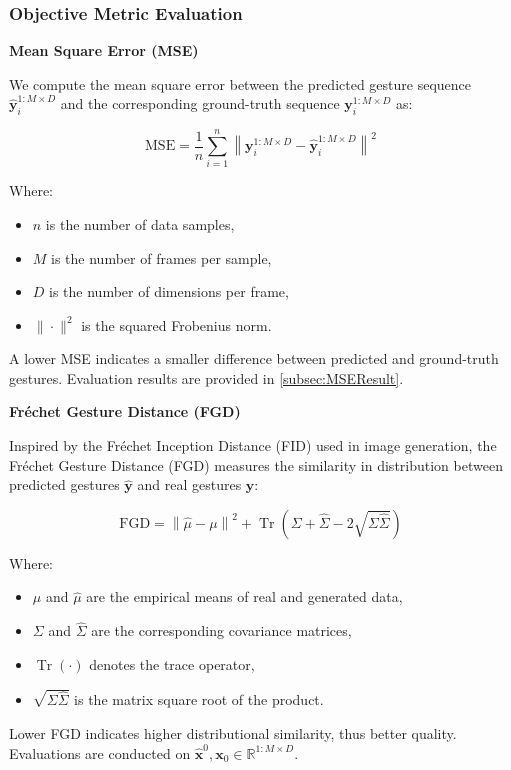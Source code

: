 
\subsubsection{Objective Metric Evaluation}

\textbf{Mean Square Error (MSE)}

We compute the mean square error between the predicted gesture sequence $\hat{\mathbf{y}}_i^{1:M \times D}$ and the corresponding ground-truth sequence $\mathbf{y}_i^{1:M \times D}$ as:

\begin{equation}
	\text{MSE} = \frac{1}{n} \sum_{i=1}^n \left\| \mathbf{y}_i^{1:M \times D} - \hat{\mathbf{y}}_i^{1:M \times D} \right\|^2
\end{equation}

Where:
\begin{itemize}
	\item $n$ is the number of data samples,
	\item $M$ is the number of frames per sample,
	\item $D$ is the number of dimensions per frame,
	\item $\|\cdot\|^2$ is the squared Frobenius norm.
\end{itemize}

A lower MSE indicates a smaller difference between predicted and ground-truth gestures. Evaluation results are provided in \autoref{subsec:MSEResult}.

\textbf{Fréchet Gesture Distance (FGD)}

Inspired by the Fréchet Inception Distance (FID) used in image generation, the Fréchet Gesture Distance (FGD) measures the similarity in distribution between predicted gestures $\hat{\mathbf{y}}$ and real gestures $\mathbf{y}$:

\begin{equation}
	\text{FGD} = \left\| \hat{\mu} - \mu \right\|^2 + \operatorname{Tr}\left( \Sigma + \hat{\Sigma} - 2 \sqrt{\Sigma \hat{\Sigma}} \right)
	\label{eq:fidscore}
\end{equation}

Where:
\begin{itemize}
	\item $\mu$ and $\hat{\mu}$ are the empirical means of real and generated data,
	\item $\Sigma$ and $\hat{\Sigma}$ are the corresponding covariance matrices,
	\item $\operatorname{Tr}(\cdot)$ denotes the trace operator,
	\item $\sqrt{\Sigma \hat{\Sigma}}$ is the matrix square root of the product.
\end{itemize}

Lower FGD indicates higher distributional similarity, thus better quality. Evaluations are conducted on $\hat{\mathbf{x}}^{0}, \mathbf{x}_0 \in \mathbb{R}^{1:M \times D}$.